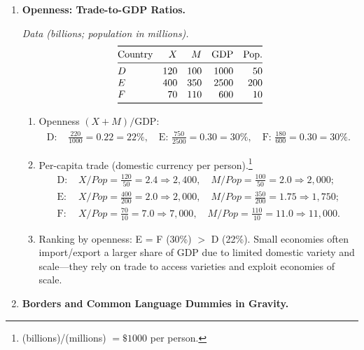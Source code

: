 \documentclass[11pt]{article}
\begin{document}
\begin{enumerate}[leftmargin=*, resume]
\newpage
\item \textbf{Openness: Trade-to-GDP Ratios.}

\emph{Data (billions; population in millions).}
\[
\begin{array}{@{}lrrrr@{}}
\toprule
\text{Country} & X & M & \text{GDP} & \text{Pop.}\\
\midrule
D & 120 & 100 & 1000 & 50\\
E & 400 & 350 & 2500 & 200\\
F & 70 & 110 & 600 & 10\\
\bottomrule
\end{array}
\]

\begin{enumerate}
\item Openness $(X{+}M)/\text{GDP}$:
\[
\begin{aligned}
\text{D: }&\frac{220}{1000}=0.22=22\%,\quad
\text{E: }\frac{750}{2500}=0.30=30\%,\quad
\text{F: }\frac{180}{600}=0.30=30\%.
\end{aligned}
\]

\item Per-capita trade (domestic currency per person).\footnote{(billions)/(millions) $=\$1000$ per person.}
\[
\begin{aligned}
\text{D: }&X/Pop = \frac{120}{50}=2.4 \Rightarrow 2{,}400,\quad
M/Pop = \frac{100}{50}=2.0 \Rightarrow 2{,}000;\\
\text{E: }&X/Pop = \frac{400}{200}=2.0 \Rightarrow 2{,}000,\quad
M/Pop=\frac{350}{200}=1.75 \Rightarrow 1{,}750;\\
\text{F: }&X/Pop = \frac{70}{10}=7.0 \Rightarrow 7{,}000,\quad
M/Pop=\frac{110}{10}=11.0 \Rightarrow 11{,}000.
\end{aligned}
\]

\item Ranking by openness: E = F (30\%) $>$ D (22\%). Small economies often import/export a larger share of GDP due to limited domestic variety and scale---they rely on trade to access varieties and exploit economies of scale.
\end{enumerate}

\item \textbf{Borders and Common Language Dummies in Gravity.}


\end{enumerate}
\end{document}
